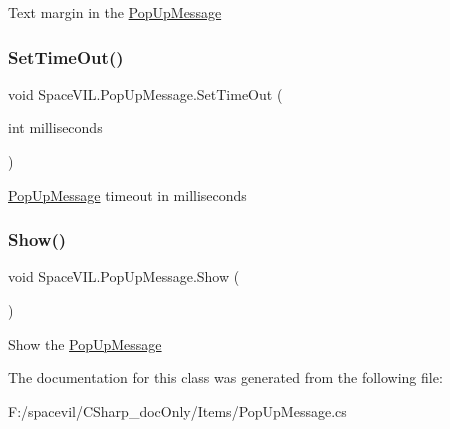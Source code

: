 Text margin in the \mbox{\hyperlink{class_space_v_i_l_1_1_pop_up_message}{Pop\+Up\+Message}} 

\mbox{\label{class_space_v_i_l_1_1_pop_up_message_aed1edbb9ca961585032b46bebd61fbea}} 
\subsubsection{\texorpdfstring{Set\+Time\+Out()}{SetTimeOut()}}
{\footnotesize\ttfamily void Space\+V\+I\+L.\+Pop\+Up\+Message.\+Set\+Time\+Out (\begin{DoxyParamCaption}\item[{int}]{milliseconds }\end{DoxyParamCaption})}



\mbox{\hyperlink{class_space_v_i_l_1_1_pop_up_message}{Pop\+Up\+Message}} timeout in milliseconds 

\mbox{\label{class_space_v_i_l_1_1_pop_up_message_acd66fca578bf2547f983d48650b0f618}} 
\subsubsection{\texorpdfstring{Show()}{Show()}}
{\footnotesize\ttfamily void Space\+V\+I\+L.\+Pop\+Up\+Message.\+Show (\begin{DoxyParamCaption}{ }\end{DoxyParamCaption})}



Show the \mbox{\hyperlink{class_space_v_i_l_1_1_pop_up_message}{Pop\+Up\+Message}} 



The documentation for this class was generated from the following file\+:\begin{DoxyCompactItemize}
\item 
F\+:/spacevil/\+C\+Sharp\+\_\+doc\+Only/\+Items/Pop\+Up\+Message.\+cs\end{DoxyCompactItemize}
